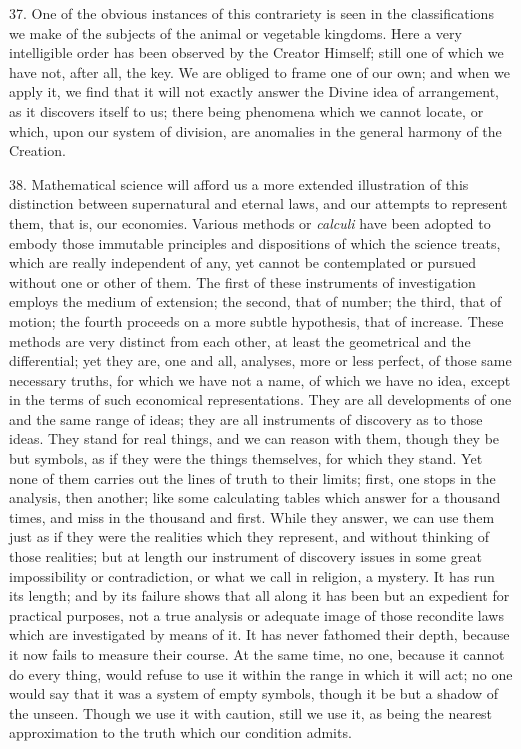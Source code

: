 37. One of the obvious instances of this contrariety is seen in the
classifications we make of the subjects of the animal or vegetable
kingdoms. Here a very intelligible order has been observed by the
Creator Himself; still one of which we have not, after all, the key.
We are obliged to frame one of our own; and when we apply it, we find
that it will not exactly answer the Divine idea of arrangement, as it
discovers itself to us; there being phenomena which we cannot locate,
or which, upon our system of division, are anomalies in the general
harmony of the Creation.

38. Mathematical science will afford us a more extended
illustration of this distinction between supernatural and eternal
laws, and our attempts to represent them, that is, our economies.
Various methods or \emph{calculi} have been adopted to embody those
immutable principles and dispositions of which the science treats,
which are really independent of any, yet cannot be contemplated or
pursued without one or other of them. The first of these instruments
of investigation employs the medium of extension; the second, that of
number; the third, that of motion; the fourth proceeds on a more
subtle hypothesis, that of increase. These methods are very distinct
from each other, at least the geometrical and the differential; yet
they are, one and all, analyses, more or less perfect, of those same
necessary truths, for which we have not a name, of which we have no
idea, except in the terms of such economical representations. They are
all developments of one and the same range of ideas; they are all
instruments of discovery as to those ideas. They stand for real
things, and we can reason with them, though they be but symbols, as if
they were the things themselves, for which they stand. Yet none of
them carries out the lines of truth to their limits; first, one stops
in the analysis, then another; like some calculating tables which
answer for a thousand times, and miss in the thousand and first. While
they answer, we can use them just as if they were the realities which
they represent, and without thinking of those realities; but at length
our instrument of discovery issues in some great impossibility or
contradiction, or what we call in religion, a mystery. It has run its
length; and by its failure shows that all along it has been but an
expedient for practical purposes, not a true analysis or adequate
image of those recondite laws which are investigated by means of it.
It has never fathomed their depth, because it now fails to measure
their course. At the same time, no one, because it cannot do every
thing, would refuse to use it within the range in which it will act;
no one would say that it was a system of empty symbols, though it be
but a shadow of the unseen. Though we use it with caution, still we
use it, as being the nearest approximation to the truth which our
condition admits.

